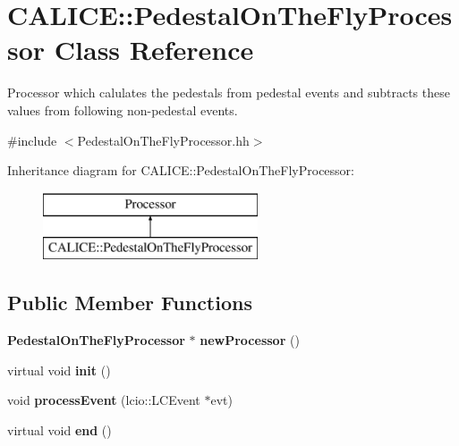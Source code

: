 \section{C\-A\-L\-I\-C\-E\-:\-:Pedestal\-On\-The\-Fly\-Processor Class Reference}
\label{classCALICE_1_1PedestalOnTheFlyProcessor}


Processor which calulates the pedestals from pedestal events and subtracts these values from following non-\/pedestal events.  




{\ttfamily \#include $<$Pedestal\-On\-The\-Fly\-Processor.\-hh$>$}

Inheritance diagram for C\-A\-L\-I\-C\-E\-:\-:Pedestal\-On\-The\-Fly\-Processor\-:\begin{figure}[H]
\begin{center}
\leavevmode
\includegraphics[height=2.000000cm]{classCALICE_1_1PedestalOnTheFlyProcessor}
\end{center}
\end{figure}
\subsection*{Public Member Functions}
\begin{DoxyCompactItemize}
\item 
{\bf Pedestal\-On\-The\-Fly\-Processor} $\ast$ {\bfseries new\-Processor} ()\label{classCALICE_1_1PedestalOnTheFlyProcessor_a10c562d70b7a3a6822d1d787680a1e2c}

\item 
virtual void {\bfseries init} ()\label{classCALICE_1_1PedestalOnTheFlyProcessor_a39648da7746870ad75bafa83eab06a09}

\item 
void {\bfseries process\-Event} (lcio\-::\-L\-C\-Event $\ast$evt)\label{classCALICE_1_1PedestalOnTheFlyProcessor_ab4d4773fe6ce8137a8e6e8f3b10c97c5}

\item 
virtual void {\bfseries end} ()\label{classCALICE_1_1PedestalOnTheFlyProcessor_a4150cde3c7b10d8f43bf28f676efefad}

\end{DoxyCompactItemize}
